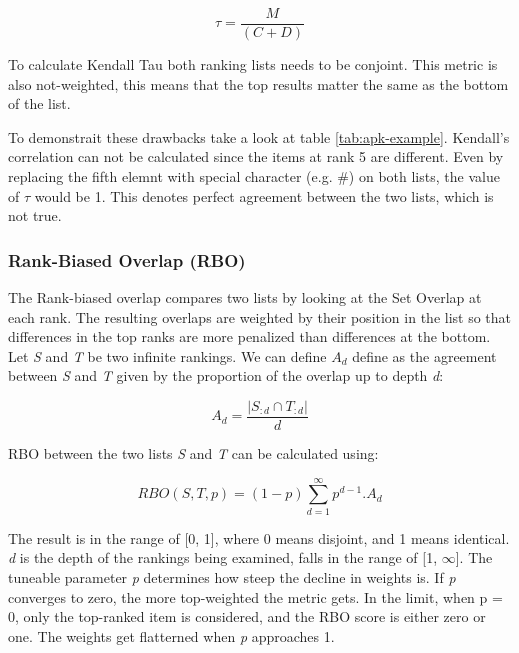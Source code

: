\begin{equation}
	\tau = \frac{M}{(C+D)}
	\label{eq:kendall-tau}
\end{equation}

To calculate Kendall Tau both ranking lists needs to be conjoint. This metric is also not-weighted, this means that the top results matter the same as the bottom of the list.

To demonstrait these drawbacks take a look at table \ref{tab:apk-example}. Kendall's correlation can not be calculated since the items at rank 5 are different. Even by replacing the fifth elemnt with special character (e.g. \#) on both lists, the value of $\tau$ would be 1. This denotes perfect agreement between the two lists, which is not true.

\subsubsection{Rank-Biased Overlap (RBO)}
The Rank-biased overlap \cite{webber2010similarity} compares two lists by looking at the Set Overlap at each rank. The resulting overlaps are weighted by their position in the list so that differences in the top ranks are more penalized than differences at the bottom. Let \emph{S} and \emph{T} be two infinite rankings. We can define $A_{d}$ define as the agreement between \emph{S} and \emph{T} given by the proportion of the overlap up to depth \emph{d}:

\begin{equation}
	A_{d} = \frac{|S_{:d} \cap T_{:d}|}{d}
	\label{eq:a-d}
\end{equation}


RBO between the two lists \emph{S} and \emph{T} can be calculated using:

\begin{equation}
	RBO(S,T,p) = (1-p)\sum_{d=1}^{\infty}p^{d-1}.A_{d}
	\label{eq:rbo}
\end{equation}


The result is in the range of [0, 1], where 0 means disjoint, and 1 means identical. \emph{d} is the depth of the rankings being examined, falls in the range of [1, $\infty$]. The tuneable parameter \emph{p} determines how steep the decline in weights is. If \emph{p} converges to zero, the more top-weighted the metric gets. In the limit, when p = 0, only the top-ranked item is considered, and the RBO score is either zero or one. The weights get flatterned when \emph{p} approaches 1.


